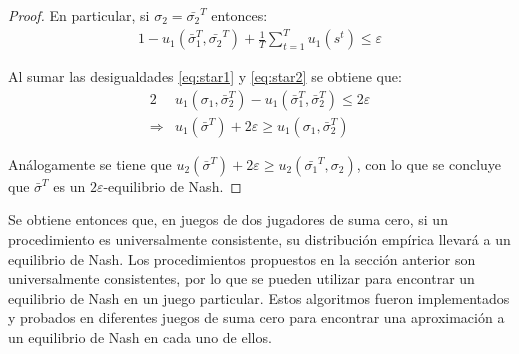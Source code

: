 \begin{proof}
En particular, si $\sigma_2 = \bar{\sigma_2}^T$ entonces:
\begin{alignat}{1}
\label{eq:star2}
-u_1(\bar{\sigma}_1^T, \bar{\sigma_2}^T) + \frac{1}{T} \sum_{t=1}^T u_1(s^t) \leq \varepsilon
\end{alignat}

Al sumar las desigualdades \ref{eq:star1} y \ref{eq:star2} se obtiene que:
\begin{alignat}{2}
& u_1(\sigma_1, \bar{\sigma}_2^T) - u_1(\bar{\sigma}_1^T, \bar{\sigma}_2^T) \leq 2\varepsilon \\
\Rightarrow & u_1(\bar{\sigma}^T) + 2\varepsilon \geq u_1(\sigma_1, \bar{\sigma}_2^T)
\end{alignat}

Análogamente se tiene que $u_2(\bar{\sigma}^T) + 2\varepsilon \geq u_2(\bar{\sigma_1}^T, \sigma_2)$, con lo que se concluye que $\bar{\sigma}^T$ es un $2\varepsilon$-equilibrio de Nash.
\end{proof}

Se obtiene entonces que, en juegos de dos jugadores de suma cero, si un procedimiento es universalmente consistente, su distribución empírica llevará a un equilibrio de Nash. Los procedimientos propuestos en la sección anterior son universalmente consistentes, por lo que se pueden utilizar para encontrar un equilibrio de Nash en un juego particular. Estos algoritmos fueron implementados y probados en diferentes juegos de suma cero para encontrar una aproximación a un equilibrio de Nash en cada uno de ellos.